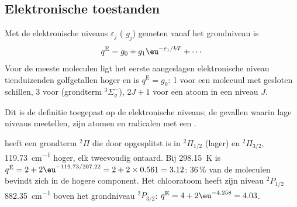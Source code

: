 \subsection*{Elektronische toestanden}

\begin{proposition}\label{prop:b3:partition-functions:q-elec}
Met de elektronische niveaus $\varepsilon_j$ ( $g_j$) gemeten
vanaf het grondniveau is
\[
  q^{\mathrm E} = g_0 + g_1\eu^{-\varepsilon_1/kT} + \cdots
\]
Voor de meeste moleculen ligt het eerste aangeslagen elektronische niveau
tienduizenden golfgetallen hoger en is $q^{\mathrm E} = g_0$: 1 voor een
molecuul met gesloten schillen, 3 voor
 (grondterm ${}^3\Sigma_g^-$), $2J + 1$ voor een atoom in een niveau $J$.
\end{proposition}

Dit is de definitie toegepast op de elektronische niveaus; de gevallen
waarin lage niveaus meetellen, zijn atomen en radicalen met een
.

\begin{example}\label{ex:b3:partition-functions:no-cl}
 heeft een grondterm ${}^2\Pi$ die door 
opgesplitst is in ${}^2\Pi_{1/2}$ (lager)
en ${}^2\Pi_{3/2}$, \qty{119.73}{cm^{-1}} hoger, elk tweevoudig ontaard. Bij
\qty{298.15}{K} is
$q^{\mathrm E} = 2 + 2\eu^{-119.73/207.22} = 2 + 2\times0.561 = 3.12$: 36\,\% van de
moleculen bevindt zich in de hogere component. Het chlooratoom heeft zijn
niveau ${}^2P_{1/2}$ \qty{882.35}{cm^{-1}}
boven het grondniveau ${}^2P_{3/2}$: $q^{\mathrm E} = 4 + 2\eu^{-4.258} = 4.03$.
\end{example}

